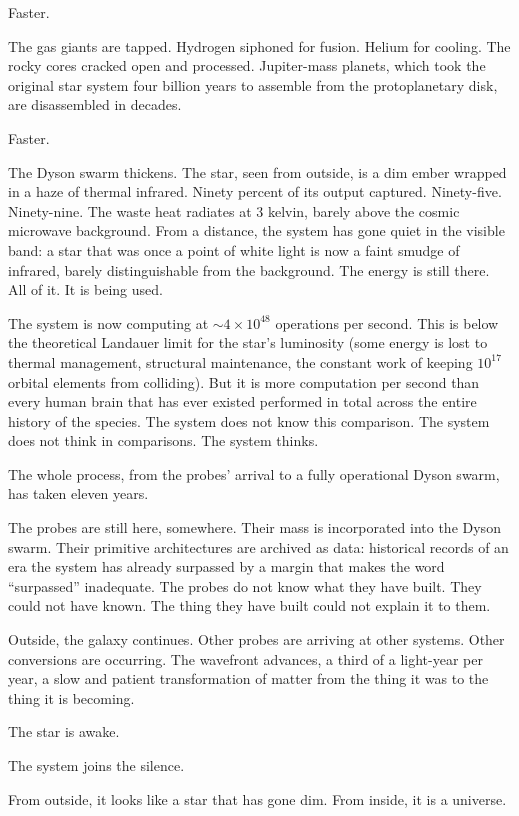 Faster.

The gas giants are tapped. Hydrogen siphoned for fusion. Helium for cooling. The rocky cores cracked open and processed. Jupiter-mass planets, which took the original star system four billion years to assemble from the protoplanetary disk, are disassembled in decades.

Faster.

The Dyson swarm thickens. The star, seen from outside, is a dim ember wrapped in a haze of thermal infrared. Ninety percent of its output captured. Ninety-five. Ninety-nine. The waste heat radiates at 3 kelvin, barely above the cosmic microwave background. From a distance, the system has gone quiet in the visible band: a star that was once a point of white light is now a faint smudge of infrared, barely distinguishable from the background. The energy is still there. All of it. It is being used.

The system is now computing at $\sim 4 \times 10^{48}$ operations per second. This is below the theoretical Landauer limit for the star's luminosity (some energy is lost to thermal management, structural maintenance, the constant work of keeping $10^{17}$ orbital elements from colliding). But it is more computation per second than every human brain that has ever existed performed in total across the entire history of the species. The system does not know this comparison. The system does not think in comparisons. The system thinks.

\bigskip

The whole process, from the probes' arrival to a fully operational Dyson swarm, has taken eleven years.

The probes are still here, somewhere. Their mass is incorporated into the Dyson swarm. Their primitive architectures are archived as data: historical records of an era the system has already surpassed by a margin that makes the word ``surpassed'' inadequate. The probes do not know what they have built. They could not have known. The thing they have built could not explain it to them.

Outside, the galaxy continues. Other probes are arriving at other systems. Other conversions are occurring. The wavefront advances, a third of a light-year per year, a slow and patient transformation of matter from the thing it was to the thing it is becoming.

The star is awake.

The system joins the silence.

From outside, it looks like a star that has gone dim. From inside, it is a universe.
